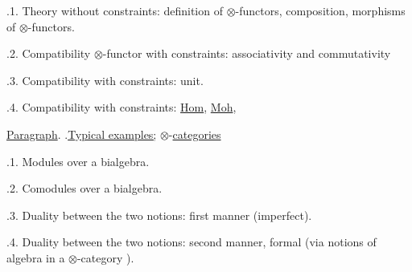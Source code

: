 .1. Theory without constraints: definition of $\otimes$-functors, composition, morphisms of $\otimes$-functors.

.2. Compatibility \rlap{ }\handwritten{ } $\otimes$-functor with constraints: associativity and commutativity\handwritten{!}

.3. Compatibility with constraints: unit.

.4. Compatibility with constraints: \uline{Hom}, \uline{Moh}, 


\uline{Paragraph}. .\qquad \uline{Typical examples;} $\otimes$-\uline{categories}


.1. Modules over a bialgebra.

.2. Comodules over a bialgebra.

.3. Duality between the two notions: first manner (imperfect).

.4. Duality between the two notions: second manner, formal (via  notions of algebra in a $\otimes$-category ).


